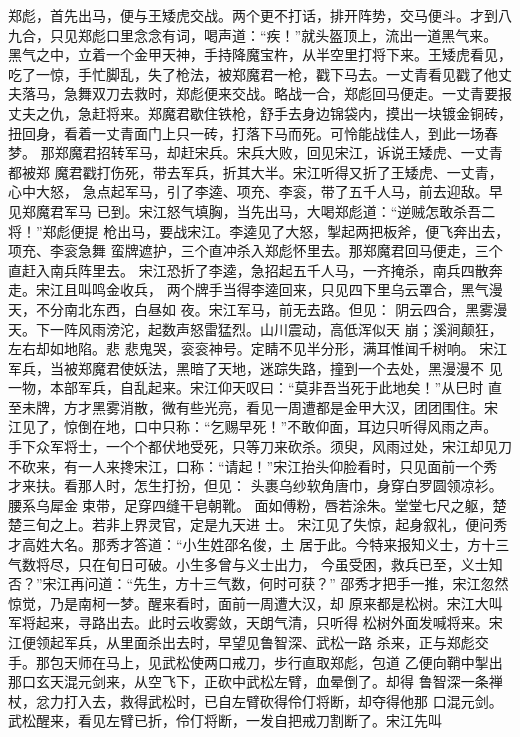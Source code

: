 郑彪，首先出马，便与王矮虎交战。两个更不打话，排开阵势，交马便斗。才到八
九合，只见郑彪口里念念有词，喝声道：“疾！”就头盔顶上，流出一道黑气来。
黑气之中，立着一个金甲天神，手持降魔宝杵，从半空里打将下来。王矮虎看见，
吃了一惊，手忙脚乱，失了枪法，被郑魔君一枪，戳下马去。一丈青看见戳了他丈
夫落马，急舞双刀去救时，郑彪便来交战。略战一合，郑彪回马便走。一丈青要报
丈夫之仇，急赶将来。郑魔君歇住铁枪，舒手去身边锦袋内，摸出一块镀金铜砖，
扭回身，看着一丈青面门上只一砖，打落下马而死。可怜能战佳人，到此一场春梦。
那郑魔君招转军马，却赶宋兵。宋兵大败，回见宋江，诉说王矮虎、一丈青都被郑
魔君戳打伤死，带去军兵，折其大半。宋江听得又折了王矮虎、一丈青，心中大怒，
急点起军马，引了李逵、项充、李衮，带了五千人马，前去迎敌。早见郑魔君军马
已到。宋江怒气填胸，当先出马，大喝郑彪道：“逆贼怎敢杀吾二将！”郑彪便提
枪出马，要战宋江。李逵见了大怒，掣起两把板斧，便飞奔出去，项充、李衮急舞
蛮牌遮护，三个直冲杀入郑彪怀里去。那郑魔君回马便走，三个直赶入南兵阵里去。
宋江恐折了李逵，急招起五千人马，一齐掩杀，南兵四散奔走。宋江且叫鸣金收兵，
两个牌手当得李逵回来，只见四下里乌云罩合，黑气漫天，不分南北东西，白昼如
夜。宋江军马，前无去路。但见：
阴云四合，黑雾漫天。下一阵风雨滂沱，起数声怒雷猛烈。山川震动，高低浑似天
崩；溪涧颠狂，左右却如地陷。悲
悲鬼哭，衮衮神号。定睛不见半分形，满耳惟闻千树响。
宋江军兵，当被郑魔君使妖法，黑暗了天地，迷踪失路，撞到一个去处，黑漫漫不
见一物，本部军兵，自乱起来。宋江仰天叹曰：“莫非吾当死于此地矣！”从巳时
直至未牌，方才黑雾消散，微有些光亮，看见一周遭都是金甲大汉，团团围住。宋
江见了，惊倒在地，口中只称：“乞赐早死！”不敢仰面，耳边只听得风雨之声。
手下众军将士，一个个都伏地受死，只等刀来砍杀。须臾，风雨过处，宋江却见刀
不砍来，有一人来搀宋江，口称：“请起！”宋江抬头仰脸看时，只见面前一个秀
才来扶。看那人时，怎生打扮，但见：
头裹乌纱软角唐巾，身穿白罗圆领凉衫。腰系乌犀金束带，足穿四缝干皂朝靴。
面如傅粉，唇若涂朱。堂堂七尺之躯，楚楚三旬之上。若非上界灵官，定是九天进
士。
宋江见了失惊，起身叙礼，便问秀才高姓大名。那秀才答道：“小生姓邵名俊，土
居于此。今特来报知义士，方十三气数将尽，只在旬日可破。小生多曾与义士出力，
今虽受困，救兵已至，义士知否？”宋江再问道：“先生，方十三气数，何时可获？”
邵秀才把手一推，宋江忽然惊觉，乃是南柯一梦。醒来看时，面前一周遭大汉，却
原来都是松树。宋江大叫军将起来，寻路出去。此时云收雾敛，天朗气清，只听得
松树外面发喊将来。宋江便领起军兵，从里面杀出去时，早望见鲁智深、武松一路
杀来，正与郑彪交手。那包天师在马上，见武松使两口戒刀，步行直取郑彪，包道
乙便向鞘中掣出那口玄天混元剑来，从空飞下，正砍中武松左臂，血晕倒了。却得
鲁智深一条禅杖，忿力打入去，救得武松时，已自左臂砍得伶仃将断，却夺得他那
口混元剑。武松醒来，看见左臂已折，伶仃将断，一发自把戒刀割断了。宋江先叫
